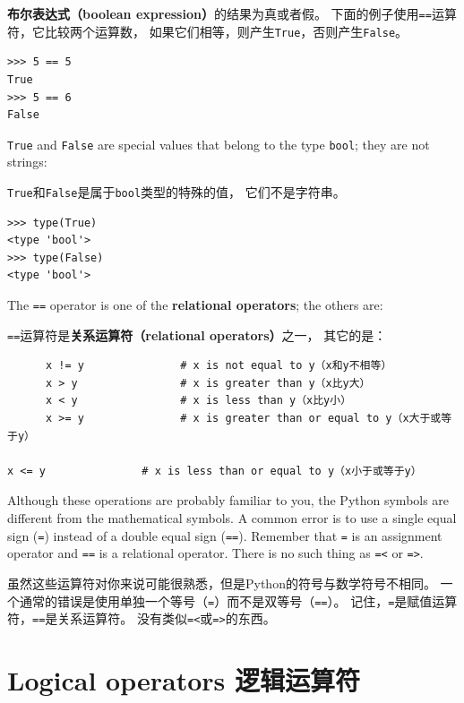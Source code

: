 \documentclass[10pt]{book}
\begin{document}
\begin{CJK}{UTF8}{gbsn}
{\bf 布尔表达式（boolean expression）}的结果为真或者假。
下面的例子使用{\tt ==}运算符，它比较两个运算数，
如果它们相等，则产生{\tt True}，否则产生{\tt False}。


\begin{verbatim}
>>> 5 == 5
True
>>> 5 == 6
False
\end{verbatim}
%
{\tt True} and {\tt False} are special
values that belong to the type {\tt bool}; they are not strings:

{\tt True}和{\tt False}是属于{\tt bool}类型的特殊的值，
它们不是字符串。

\begin{verbatim}
>>> type(True)
<type 'bool'>
>>> type(False)
<type 'bool'>
\end{verbatim}
%
The {\tt ==} operator is one of the {\bf relational operators}; the
others are:

{\tt ==}运算符是{\bf 关系运算符（relational operators）}之一，
其它的是：

\begin{verbatim}
      x != y               # x is not equal to y（x和y不相等）
      x > y                # x is greater than y（x比y大）
      x < y                # x is less than y（x比y小）
      x >= y               # x is greater than or equal to y（x大于或等于y）
      x <= y               # x is less than or equal to y（x小于或等于y）
\end{verbatim}
%
Although these operations are probably familiar to you, the Python
symbols are different from the mathematical symbols.  A common error
is to use a single equal sign ({\tt =}) instead of a double equal sign
({\tt ==}).  Remember that {\tt =} is an assignment operator and
{\tt ==} is a relational operator.   There is no such thing as
{\tt =<} or {\tt =>}.

虽然这些运算符对你来说可能很熟悉，但是Python的符号与数学符号不相同。
一个通常的错误是使用单独一个等号（{\tt =}）而不是双等号（{\tt ==}）。
记住，{\tt =}是赋值运算符，{\tt ==}是关系运算符。
没有类似{\tt =<}或{\tt =>}的东西。

\section {Logical operators 逻辑运算符}


\end{CJK}
\end{document}
